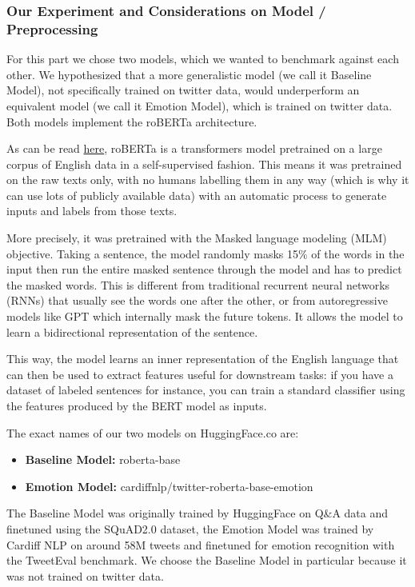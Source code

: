 \documentclass{article}
\begin{document}
\subsubsection{Our Experiment and Considerations on Model / Preprocessing}

For this part we chose two models, which we wanted to benchmark against each other. We hypothesized that a more generalistic model (we call it Baseline Model), not specifically trained on twitter data, would underperform an equivalent model (we call it Emotion Model), which is trained on twitter data. Both models implement the roBERTa architecture.

As can be read \href{https://huggingface.co/roberta-base}{here}, roBERTa is a transformers model pretrained on a large corpus of English data in a self-supervised fashion. This means it was pretrained on the raw texts only, with no humans labelling them in any way (which is why it can use lots of publicly available data) with an automatic process to generate inputs and labels from those texts.

More precisely, it was pretrained with the Masked language modeling (MLM) objective. Taking a sentence, the model randomly masks 15\% of the words in the input then run the entire masked sentence through the model and has to predict the masked words. This is different from traditional recurrent neural networks (RNNs) that usually see the words one after the other, or from autoregressive models like GPT which internally mask the future tokens. It allows the model to learn a bidirectional representation of the sentence.

This way, the model learns an inner representation of the English language that can then be used to extract features useful for downstream tasks: if you have a dataset of labeled sentences for instance, you can train a standard classifier using the features produced by the BERT model as inputs.

The exact names of our two models on HuggingFace.co are:
\begin{itemize}
    \item \textbf{Baseline Model:} roberta-base
    \item \textbf{Emotion Model:} cardiffnlp/twitter-roberta-base-emotion
\end{itemize}

The Baseline Model was originally trained by HuggingFace on Q\&A data and finetuned using the SQuAD2.0 dataset, the Emotion Model was trained by Cardiff NLP on around 58M tweets and finetuned for emotion recognition with the TweetEval benchmark. We choose the Baseline Model in particular because it was not trained on twitter data.
\end{document}
